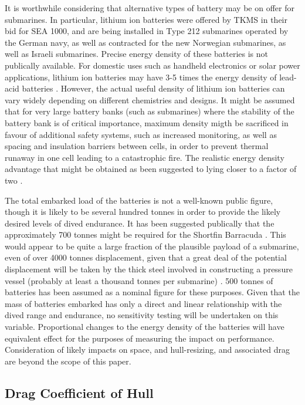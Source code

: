 \documentclass{article}\usepackage[]{graphicx}\usepackage[]{color}
\begin{document}
It is worthwhile considering that alternative types of battery may be on offer for submarines.  In particular, lithium ion batteries were offered by TKMS in their bid for SEA 1000, and are being installed in Type 212 submarines operated by the German navy, as well as contracted for the new Norwegian submarines, as well as Israeli submarines. Precise energy density of these batteries is not publically available.  For domestic uses such as handheld electronics or solar power applications, lithium ion batteries may have 3-5 times the energy density of lead-acid batteries \parencite{oconnor2017}.  However, the actual useful density of lithium ion batteries can vary widely depending on different chemistries and designs.  It might be assumed that for very large battery banks (such as submarines) where the stability of the battery bank is of critical importance, maximum density migth be sacrificed in favour of additional safety systems, such as increased monitoring, as well as spacing and insulation barriers between cells, in order to prevent thermal runaway in one cell leading to a catastrophic fire.  The realistic energy density advantage that might be obtained as been suggested to lying closer to a factor of two \parencite{greenfield2016}.

The total embarked load of the batteries is not a well-known public figure, though it is likely to be several hundred tonnes in order to provide the likely desired levels of dived endurance.  It has been suggested publically that the approximately 700 tonnes might be required for the Shortfin Barracuda \parencite{ohff2017}.  This would appear to be quite a large fraction of the plausible payload of a submarine, even of over 4000 tonnes displacement, given that a great deal of the potential displacement will be taken by the thick steel involved in constructing a pressure vessel (probably at least a thousand tonnes per submarine) \parencite{jean2017}.  500 tonnes of batteries has been assumed as a nominal figure for these purposes.  Given that the mass of batteries embarked has only a direct and linear relationship with the dived range and endurance, no sensitivity testing will be undertaken on this variable.  Proportional changes to the energy density of the batteries will have equivalent effect for the purposes of measuring the impact on performance. Consideration of likely impacts on space, and hull-resizing, and associated drag are beyond the scope of this paper.

\subsection{Drag Coefficient of Hull}
\end{document}
